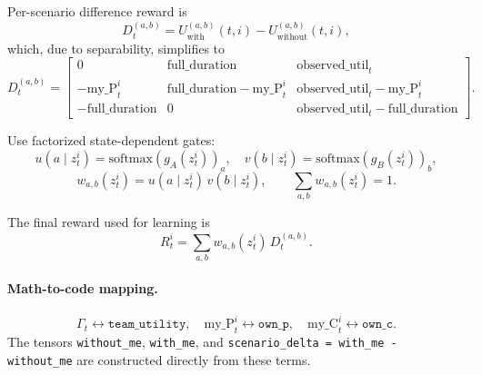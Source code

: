 \documentclass[11pt]{article}
\begin{document}
Per-scenario difference reward is
\[
D_t^{(a,b)} = U_{\text{with}}^{(a,b)}(t,i)-U_{\text{without}}^{(a,b)}(t,i),
\]
which, due to separability, simplifies to
\[
D_t^{(a,b)} =
\begin{bmatrix}
0 & \text{full\_duration} & \text{observed\_util}_t \\
-\text{my\_P}_t^i & \text{full\_duration}-\text{my\_P}_t^i & \text{observed\_util}_t - \text{my\_P}_t^i \\
-\text{full\_duration} & 0 & \text{observed\_util}_t - \text{full\_duration}
\end{bmatrix}.
\]

Use factorized state-dependent gates:
\[
u(a \mid z_t^i) = \mathrm{softmax}(g_A(z_t^i))_a,\quad
v(b \mid z_t^i) = \mathrm{softmax}(g_B(z_t^i))_b,
\]
\[
w_{a,b}(z_t^i) = u(a \mid z_t^i)\,v(b \mid z_t^i), \qquad \sum_{a,b} w_{a,b}(z_t^i) = 1.
\]

The final reward used for learning is
\[
R_t^i = \sum_{a,b} w_{a,b}(z_t^i)\,D_t^{(a,b)}.
\]

\paragraph{Math-to-code mapping.}
\[
\Gamma_t \leftrightarrow \texttt{team\_utility},\quad
\text{my\_P}_t^i \leftrightarrow \texttt{own\_p},\quad
\text{my\_C}_t^i \leftrightarrow \texttt{own\_c}.
\]
The tensors \texttt{without\_me}, \texttt{with\_me}, and
\texttt{scenario\_delta = with\_me - without\_me} are constructed directly from these terms.
\end{document}

